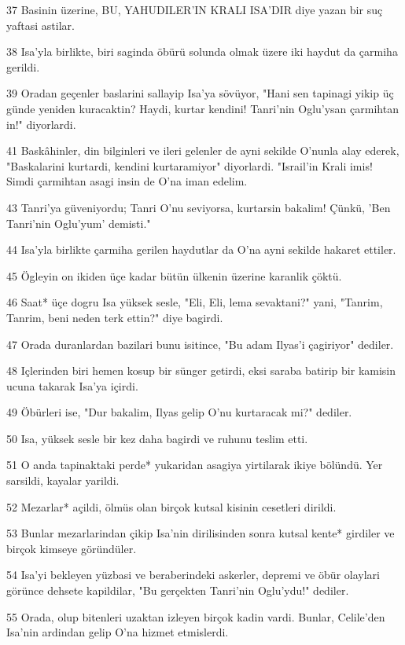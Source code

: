 \par 37 Basinin üzerine, BU, YAHUDILER'IN KRALI ISA'DIR diye yazan bir suç yaftasi astilar.
\par 38 Isa'yla birlikte, biri saginda öbürü solunda olmak üzere iki haydut da çarmiha gerildi.
\par 39 Oradan geçenler baslarini sallayip Isa'ya sövüyor, "Hani sen tapinagi yikip üç günde yeniden kuracaktin? Haydi, kurtar kendini! Tanri'nin Oglu'ysan çarmihtan in!" diyorlardi.
\par 41 Baskâhinler, din bilginleri ve ileri gelenler de ayni sekilde O'nunla alay ederek, "Baskalarini kurtardi, kendini kurtaramiyor" diyorlardi. "Israil'in Krali imis! Simdi çarmihtan asagi insin de O'na iman edelim.
\par 43 Tanri'ya güveniyordu; Tanri O'nu seviyorsa, kurtarsin bakalim! Çünkü, 'Ben Tanri'nin Oglu'yum' demisti."
\par 44 Isa'yla birlikte çarmiha gerilen haydutlar da O'na ayni sekilde hakaret ettiler.
\par 45 Ögleyin on ikiden üçe kadar bütün ülkenin üzerine karanlik çöktü.
\par 46 Saat* üçe dogru Isa yüksek sesle, "Eli, Eli, lema sevaktani?" yani, "Tanrim, Tanrim, beni neden terk ettin?" diye bagirdi.
\par 47 Orada duranlardan bazilari bunu isitince, "Bu adam Ilyas'i çagiriyor" dediler.
\par 48 Içlerinden biri hemen kosup bir sünger getirdi, eksi saraba batirip bir kamisin ucuna takarak Isa'ya içirdi.
\par 49 Öbürleri ise, "Dur bakalim, Ilyas gelip O'nu kurtaracak mi?" dediler.
\par 50 Isa, yüksek sesle bir kez daha bagirdi ve ruhunu teslim etti.
\par 51 O anda tapinaktaki perde* yukaridan asagiya yirtilarak ikiye bölündü. Yer sarsildi, kayalar yarildi.
\par 52 Mezarlar* açildi, ölmüs olan birçok kutsal kisinin cesetleri dirildi.
\par 53 Bunlar mezarlarindan çikip Isa'nin dirilisinden sonra kutsal kente* girdiler ve birçok kimseye göründüler.
\par 54 Isa'yi bekleyen yüzbasi ve beraberindeki askerler, depremi ve öbür olaylari görünce dehsete kapildilar, "Bu gerçekten Tanri'nin Oglu'ydu!" dediler.
\par 55 Orada, olup bitenleri uzaktan izleyen birçok kadin vardi. Bunlar, Celile'den Isa'nin ardindan gelip O'na hizmet etmislerdi.
